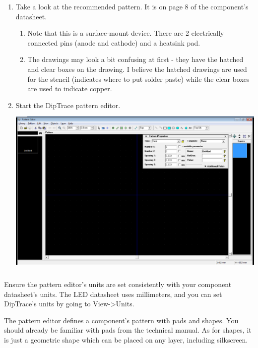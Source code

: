 \documentclass[letterpaper]{article}
\newcommand\liststyleRTFNumxi{%
\renewcommand\theenumi{\arabic{enumi}}
\renewcommand\theenumii{\alph{enumii}}
\renewcommand\theenumiii{\roman{enumiii}}
\renewcommand\theenumiv{\arabic{enumiv}}
\renewcommand\labelenumi{\theenumi.}
\renewcommand\labelenumii{\theenumii.}
\renewcommand\labelenumiii{\theenumiii.}
\renewcommand\labelenumiv{\theenumiv.}
}
\begin{document}
\liststyleRTFNumxi
\begin{enumerate}
\item {\sffamily\color[rgb]{0.30980393,0.5058824,0.7411765}
Take a look at the recommended pattern. It is on page 8 of the component's datasheet.}

\begin{enumerate}
\item {\sffamily\color[rgb]{0.30980393,0.5058824,0.7411765}
Note that this is a surface-mount device. There are 2 electrically connected pins (anode and cathode) and a heatsink
pad.}
\item {\sffamily\color[rgb]{0.30980393,0.5058824,0.7411765}
The drawings may look a bit confusing at first - they have the hatched and clear boxes on the drawing. I believe the
hatched drawings are used for the stencil (indicates where to put solder paste) while the clear boxes are used to
indicate copper.}
\end{enumerate}
\item {\sffamily\color[rgb]{0.30980393,0.5058824,0.7411765}
Start the DipTrace pattern editor.\newline
 \includegraphics[width=5.4in,height=3.3665in]{figures/ee4document-img030.png} }
\end{enumerate}
{\sffamily\color[rgb]{0.30980393,0.5058824,0.7411765}
Ensure the pattern editor's units are set consistently with your component datasheet's units. The LED datasheet uses
millimeters, and you can set DipTrace's units by going to View-{\textgreater}Units.}

{\sffamily\color[rgb]{0.30980393,0.5058824,0.7411765}
The pattern editor defines a component's pattern with pads and shapes. You should already be familiar with pads from the
technical manual. As for shapes, it is just a geometric shape which can be placed on any layer, including silkscreen.}
\end{document}
